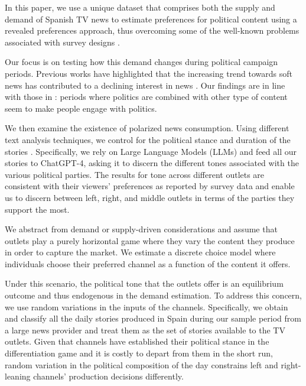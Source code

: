 \documentclass[12pt]{article}
\begin{document}
In this paper, we use a unique dataset that comprises both the supply and demand of Spanish TV news to estimate preferences for political content using a revealed preferences approach, thus overcoming some of the well-known problems associated with survey designs \citep{prior}.

Our focus is on testing how this demand changes during political campaign periods.  Previous works have highlighted that the increasing trend towards soft news has contributed to a declining interest in news   \citep{patterson2000doing} . Our findings are in line with those in \cite{gambaro2021revealed}: periods where politics are combined with other type of content seem to make people engage with politics.

We then examine the existence of polarized news consumption.  Using different text analysis techniques,  we control for the political stance and duration of the stories \citep{puglisi_review}. Specifically, we rely on Large Language Models (LLMs) and feed all our stories to ChatGPT-4, asking it to discern the different tones associated with the various political parties. The results for tone across different outlets are consistent with their viewers' preferences as reported by survey data and enable us to discern between left, right, and middle outlets in terms of the parties they support the most.

We abstract from demand or supply-driven considerations \citep{gentzkow2011competition} and assume that outlets play a purely horizontal game where they vary the content they produce in order to capture the market. We estimate a discrete choice model \citep{berry1994estimating} where individuals choose their preferred channel as a function of the content it offers.  

Under this scenario, the political tone that the outlets offer is an equilibrium outcome and thus endogenous in the demand estimation. To address this concern, we use random variations in the inputs of the channels. Specifically, we obtain and classify all the daily stories produced in Spain during our sample period from a large news provider and treat them as the set of stories available to the TV outlets. Given that channels have established their political stance in the differentiation game and it is costly to depart from them in the short run, random variation in the political composition of the day constrains left and right-leaning channels' production decisions differently.
\end{document}
